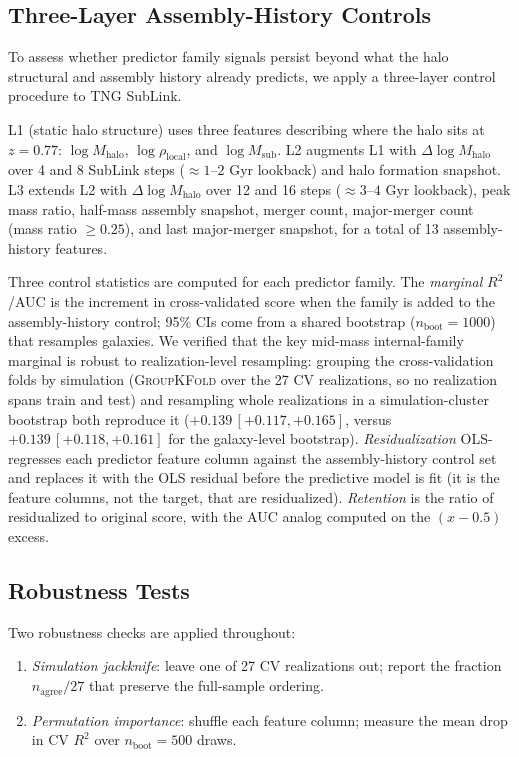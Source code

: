 \documentclass[twocolumn,linenumbers]{aastex701}
\begin{document}
\subsection{Three-Layer Assembly-History Controls}
\label{sec:geometry}

To assess whether predictor family signals persist beyond what the halo
structural and assembly history already predicts, we apply a three-layer
control procedure to TNG SubLink.

L1 (static halo structure) uses three features describing where the halo
sits at $z = 0.77$: $\log M_\mathrm{halo}$, $\log \rho_\mathrm{local}$,
and $\log M_\mathrm{sub}$.
L2 augments L1 with $\Delta\log M_\mathrm{halo}$ over 4 and 8 SubLink steps
($\approx 1$--$2$ Gyr lookback) and halo formation snapshot.
L3 extends L2 with $\Delta\log M_\mathrm{halo}$ over 12 and 16 steps
($\approx 3$--$4$ Gyr lookback), peak mass ratio, half-mass assembly
snapshot, merger count, major-merger count (mass ratio $\geq 0.25$), and
last major-merger snapshot, for a total of 13 assembly-history features.

Three control statistics are computed for each predictor family.
The \textit{marginal} $R^2$/AUC is the increment in cross-validated score
when the family is added to the assembly-history control; 95\% CIs come from
a shared bootstrap ($n_\mathrm{boot} = 1000$) that resamples galaxies.
We verified that the key mid-mass internal-family marginal is robust to
realization-level resampling: grouping the cross-validation folds by simulation
(\textsc{GroupKFold} over the 27 CV realizations, so no realization spans train
and test) and resampling whole realizations in a simulation-cluster bootstrap
both reproduce it ($+0.139\,[+0.117, +0.165]$, versus $+0.139\,[+0.118, +0.161]$
for the galaxy-level bootstrap).
\textit{Residualization} OLS-regresses each predictor feature column against
the assembly-history control set and replaces it with the OLS residual before
the predictive model is fit (it is the feature columns, not the target, that
are residualized).
\textit{Retention} is the ratio of residualized to original score, with the
AUC analog computed on the $(x - 0.5)$ excess.

\subsection{Robustness Tests}
\label{sec:robustness_design}

Two robustness checks are applied throughout:
\begin{enumerate}
  \item \textit{Simulation jackknife}: leave one of 27 CV realizations out;
    report the fraction $n_\mathrm{agree}/27$ that preserve the full-sample
    ordering.
  \item \textit{Permutation importance}: shuffle each feature column; measure
    the mean drop in CV $R^2$ over $n_\mathrm{boot} = 500$ draws.
\end{enumerate}
\end{document}
